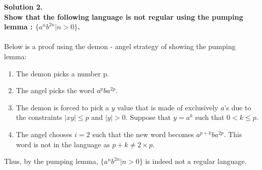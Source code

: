 \documentclass{article}
\begin{document}
\noindent \textbf{Solution 2. 
\\Show that the following language is not regular using the pumping lemma : \(\{a^n b^{2n}|n>0\}\).}
\\
\\\noindent Below is a proof using the demon - angel strategy of showing the pumping lemma:
\begin{enumerate}
    \item The demon picks a number p.
    \item The angel picks the word \(a^p b a^{2p}\).
    \item The demon is forced to pick a \(y\) value that is made of exclusively \(a\)'s due to the constraints \(|xy|\leq p\) and \(|y|>0\). Suppose that \(y=a^k\) such that \(0<k\leq p\).
    \item The angel chooses \(i=2\) such that the new word becomes \(a^{p+k} b a^{2p}\). This word is not in the language as \(p+k \neq 2\times p\).
\end{enumerate}
Thus, by the pumping lemma, \(\{a^n b^{2n}|n>0\}\) is indeed not a regular language.
\\
\\
\end{document}
